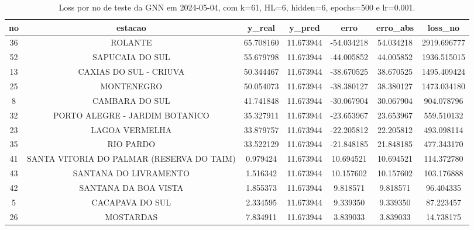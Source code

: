 \begin{table}[h]
\centering
\caption{Loss por no de teste da GNN em 2024-05-04, com k=61, HL=6, hidden=6, epochs=500 e lr=0.001.}
\label{tab:gnn_loss_k61_hl6_h6_e500_d20240504}
\begin{tabular}{ccccccc}
\toprule
no & estacao & y\_real & y\_pred & erro & erro\_abs & loss\_no \\
\midrule
36 & ROLANTE & 65.708160 & 11.673944 & -54.034218 & 54.034218 & 2919.696777 \\
52 & SAPUCAIA DO SUL & 55.679798 & 11.673944 & -44.005852 & 44.005852 & 1936.515015 \\
13 & CAXIAS DO SUL - CRIUVA & 50.344467 & 11.673944 & -38.670525 & 38.670525 & 1495.409424 \\
25 & MONTENEGRO & 50.054073 & 11.673944 & -38.380127 & 38.380127 & 1473.034180 \\
8 & CAMBARA DO SUL & 41.741848 & 11.673944 & -30.067904 & 30.067904 & 904.078796 \\
32 & PORTO ALEGRE - JARDIM BOTANICO & 35.327911 & 11.673944 & -23.653967 & 23.653967 & 559.510132 \\
23 & LAGOA VERMELHA & 33.879757 & 11.673944 & -22.205812 & 22.205812 & 493.098114 \\
35 & RIO PARDO & 33.522129 & 11.673944 & -21.848185 & 21.848185 & 477.343170 \\
41 & SANTA VITORIA DO PALMAR (RESERVA DO TAIM) & 0.979424 & 11.673944 & 10.694521 & 10.694521 & 114.372780 \\
43 & SANTANA DO LIVRAMENTO & 1.516342 & 11.673944 & 10.157602 & 10.157602 & 103.176888 \\
42 & SANTANA DA BOA VISTA & 1.855373 & 11.673944 & 9.818571 & 9.818571 & 96.404335 \\
5 & CACAPAVA DO SUL & 2.334595 & 11.673944 & 9.339350 & 9.339350 & 87.223457 \\
26 & MOSTARDAS & 7.834911 & 11.673944 & 3.839033 & 3.839033 & 14.738175 \\
\bottomrule
\end{tabular}
\end{table}
